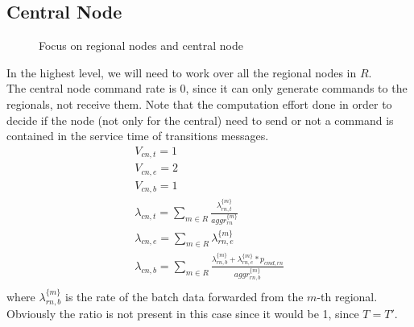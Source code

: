 \documentclass[11pt]{article}
\begin{document}
\subsection{Central Node}
\begin{figure}[H]
	\centering
	\hspace*{-3.7cm}
	\frame{}
	\caption{Focus on regional nodes and central node}
\end{figure}
In the highest level, we will need to work over all the regional nodes in $R$.\\
The central node command rate is 0, since it can only generate commands to the regionals, not receive them. Note that the computation effort done in order to decide if the node (not only for the central) need to send or not a command is contained in the service time of transitions messages. 
\begin{equation}
	\begin{array}{l}
		V_{cn, t} = 1 \\
		V_{cn, e} = 2 \\ %
		V_{cn, b} = 1 \\
        \lambda_{cn, t} = \sum\limits_{m \in R}{ \frac{\lambda^{\{m\}}_{rn, t}}{aggr^{\{ m \}}_{rn}}}  \\
        \lambda_{cn, e} = \sum\limits_{m \in R}{\lambda^{\{m\}}_{rn, e}} \\
		\lambda_{cn,b}=\sum\limits_{m \in R}\frac{\lambda_{rn,b}^{\{m\}}+\lambda_{rn,e}^{\{m\}}*p_{cmd,rn}}{aggr^{\{ m \}}_{rn,b}}\\
	\end{array}
\end{equation}
where $\lambda^{\{ m \}}_{rn, b}$ is the rate of the batch data forwarded from the $m$-th regional.
Obviously the ratio is not present in this case since it would be 1, since $T = T'$.\\
\end{document}
